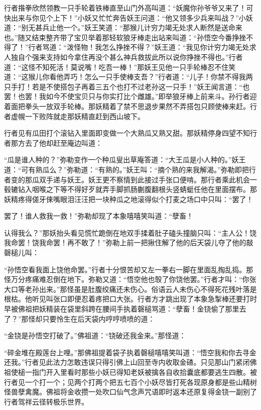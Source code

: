 \documentclass[12pt,UTF8]{ctexbook}
\begin{document}
行者揝拳欣然领教一只手轮着铁棒直至山门外高叫道：“妖魔你孙爷爷又来了！可快出来与你见个上下！”小妖又忙忙奔告妖王问道：“他又领多少兵来叫战？”小妖道：“别无甚兵止他一个。”妖王笑道：“那猴儿计穷力竭无处求人断然是送命来也。”随又结束整齐带了宝贝举着那轻软狼牙棒走出站来叫道：“孙悟空今番挣挫不得了！”行者骂道：“泼怪物！我怎么挣挫不得？”妖王道：“我见你计穷力竭无处求人独自个强来支持如今拿住再没个甚么神兵救拔此所以说你挣挫不得也。”行者道：“这怪不知死活！莫说嘴！吃吾一棒！”那妖王见他一只手轮棒忍不住笑道：“这猴儿你看他弄巧！怎么一只手使棒支吾？”行者道：“儿子！你禁不得我两只手打！若是不使搭包子再着三五个也打不过老孙这一只手！”妖王闻言道：“也罢！也罢！我如今不使宝贝只与你实打比个雌雄。”即举狼牙棒上前来斗。孙行者迎着面把拳头一放双手轮棒。那妖精着了禁不思退步果然不弄搭包只顾使棒来赶。行者虚幌一下败阵就走那妖精直赶到西山坡下。

行者见有瓜田打个滚钻入里面即变做一个大熟瓜又熟又甜。那妖精停身四望不知行者那方去了他却赶至庵边叫道：

“瓜是谁人种的？”弥勒变作一个种瓜叟出草庵答道：“大王瓜是小人种的。”妖王道：“可有熟瓜么？”弥勒道：“有熟的。”妖王叫：“摘个熟的来我解渴。”弥勒即把行者变的那瓜双手递与妖王。妖王更不察情到此接过手张口便啃。那行者乘此机会一毂辘钻入咽喉之下等不得好歹就弄手脚抓肠蒯腹翻根头竖蜻蜓任他在里面摆布。那妖精疼得傞牙倈嘴眼泪汪汪把一块种瓜之地滚得似个打麦之场口中只叫：“罢了！

罢了！谁人救我一救！”弥勒却现了本象嘻嘻笑叫道：“孽畜！

认得我么？”那妖抬头看见慌忙跪倒在地双手揉着肚子磕头撞脑只叫：“主人公！饶我命罢！饶我命罢！再不敢了！”弥勒上前一把揪住解了他的后天袋儿夺了他的敲磬槌儿叫：

“孙悟空看我面上饶他命罢。”行者十分恨苦却又左一拳右一脚在里面乱掏乱捣。那怪万分疼痛难忍倒在地下。弥勒又道：“悟空他也彀了你饶他罢。”行者才叫：“你张大口等老孙出来。”那怪虽是肚腹绞痛还未伤心。俗语云人未伤心不得死花残叶落是根枯。他听见叫张口即便忍着疼把口大张。行者方才跳出现了本象急掣棒还要打时早被佛祖把妖精装在袋里斜跨在腰间手执着磬槌骂道：“孽畜！金铙偷了那里去了？”那怪却只要怜生在后天袋内哼哼喷喷的道：

“金铙是孙悟空打破了。”佛祖道：“铙破还我金来。”那怪道：

“碎金堆在殿莲台上哩。”那佛祖提着袋子执着磬槌嘻嘻笑叫道：“悟空我和你去寻金还我。”行者见此法力怎敢违误只得引佛上山回至寺内收取金碴。只见那山门紧闭佛祖使槌一指门开入里看时那些小妖已得知老妖被擒各自收拾囊底都要逃生四散。被行者见一个打一个；见两个打两个把五七百个小妖尽皆打死各现原身都是些山精树怪兽孽禽魔。佛祖将金收攒一处吹口仙气念声咒语即时返本还原复得金铙一副别了行者驾祥云径转极乐世界。
\end{document}
